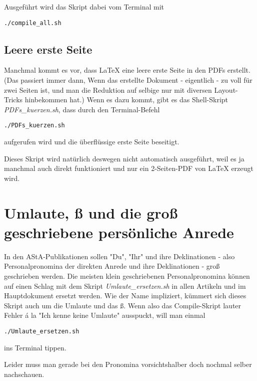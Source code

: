 \documentclass[a4paper,10pt]{article}
\begin{document}
Ausgeführt wird das Skript dabei vom Terminal mit
\begin{verbatim}
./compile_all.sh
\end{verbatim}

\subsection*{Leere erste Seite}
Manchmal kommt es vor, dass \LaTeX{} eine leere erste Seite in den PDFs erstellt. (Das passiert immer dann, Wenn das erstellte Dokument - eigentlich - zu voll für zwei Seiten ist, und man die Reduktion auf selbige nur mit diversen Layout-Tricks hinbekommen hat.) Wenn es dazu kommt, gibt es das Shell-Skript \textit{PDFs\_kuerzen.sh}, dass durch den Terminal-Befehl
\begin{verbatim}
./PDFs_kuerzen.sh
\end{verbatim}
aufgerufen wird und die überflüssige erste Seite beseitigt.

Dieses Skript wird natürlich deswegen nicht automatisch ausgeführt, weil es ja manchmal auch direkt funktioniert und nur ein 2-Seiten-PDF von \LaTeX{} erzeugt wird.

\section{Umlaute, ß und die groß geschriebene persönliche Anrede}
In den AStA-Publikationen sollen "Du", "Ihr" und ihre Deklinationen - also Personalpronomina der direkten Anrede und ihre Deklinationen - groß geschrieben werden. Die meisten klein geschriebenen Personalpronomina können auf einen Schlag mit dem Skript \textit{Umlaute\_ersetzen.sh} in allen Artikeln und im Hauptdokument ersetzt werden. Wie der Name impliziert, kümmert sich dieses Skript auch um die Umlaute und das ß. Wenn also das Compile-Skript lauter Fehler \'a la "Ich kenne keine Umlaute" ausspuckt, will man einmal
\begin{verbatim}
./Umlaute_ersetzen.sh
\end{verbatim}
ins Terminal tippen.

Leider muss man gerade bei den Pronomina vorsichtshalber doch nochmal selber nachschauen.
\end{document}
